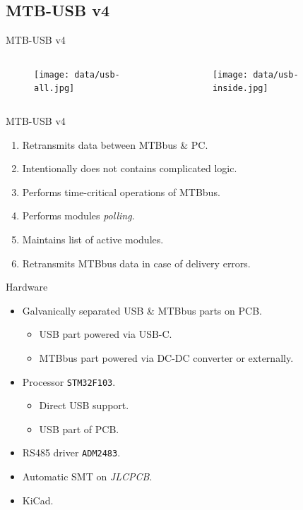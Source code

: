 \documentclass[aspectratio=169]{beamer}
\begin{document}
\subsection{MTB-USB v4}

\begin{frame}{MTB-USB v4}
\begin{columns}
	\begin{column}{.4\textwidth}
		\begin{figure}
		\texttt{[image: data/usb-all.jpg]}
		\end{figure}
	\end{column}
	\begin{column}{.6\textwidth}
		\begin{figure}
		\texttt{[image: data/usb-inside.jpg]}
		\end{figure}
	\end{column}
\end{columns}
\end{frame}


\begin{frame}{MTB-USB v4}
\begin{enumerate}
\item Retransmits data between MTBbus \& PC.
\item Intentionally does not contains complicated logic.
\item Performs time-critical operations of MTBbus.
\item Performs modules \textit{polling}.
\item Maintains list of active modules.
\item Retransmits MTBbus data in case of delivery errors.
\end{enumerate}
\end{frame}


\begin{frame}{Hardware}
\begin{itemize}
\item Galvanically separated USB \& MTBbus parts on PCB.
\begin{itemize}
\item USB part powered via USB-C.
\item MTBbus part powered via DC-DC converter or externally.
\end{itemize}
\item Processor \texttt{STM32F103}.
\begin{itemize}
\item Direct USB support.
\item USB part of PCB.
\end{itemize}
\item RS485 driver \texttt{ADM2483}.
\item Automatic SMT on \textit{JLCPCB}.
\item KiCad.
\end{itemize}
\end{frame}
\end{document}
